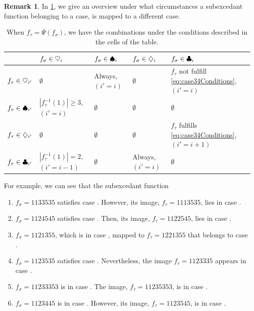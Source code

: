 \documentclass[reqno]{amsart}
\theoremstyle{definition}
\newtheorem{remark}[theorem]{Remark}
\newcommand{\fretherD}{\Psi}
\begin{document}
\begin{remark}
In \cref{tab:casesCombinations}, we give an overview under what circumstances 
a subexcedant function belonging to a case, is mapped to a different case.
%
\begin{table}[!ht]
\begin{center}
\begin{tabular}{ l p{2cm} p{1.7cm} p{1.7cm} p{2.5cm} }
\; & $f_\sigma\in\caseOne[i]$ & $f_\sigma\in\caseTwo[i]$ & $f_\sigma\in\caseThree[i]$ & $f_\sigma\in\caseFour[i]$ \\
\toprule
\rowcolor{gray!10}
$f_\tau\in\caseOne[i']$   & $\emptyset$  & Always, $(i'=i)$ & $\emptyset$ & $f_\tau$ not fulfill \eqref{eq:case34Conditions}, $(i'=i)$ \\
$f_\tau\in\caseTwo[i']$   & $|f_\tau^{-1}(1)|\geq 3$, $(i'=i)$  & $\emptyset$ & $\emptyset$ & $\emptyset$\\
\rowcolor{gray!10}
$f_\tau\in\caseThree[i']$ & $\emptyset$  & $\emptyset$ & $\emptyset$ & $f_\tau$ fulfills \eqref{eq:case34Conditions},  $(i'=i+1)$ \\
$f_\tau\in\caseFour[i']$  & $|f_\tau^{-1}(1)| =2$, $(i'=i-1)$  & $\emptyset$ & Always, $(i'=i)$ & $\emptyset$\\
\bottomrule
\end{tabular}
\medskip
\caption{
When $f_\tau = \fretherD(f_\sigma)$, we have the combinations under the 
conditions described in the cells of the table.
}\label{tab:casesCombinations}
\end{center}
\end{table}
\end{remark}

For example, we can see that the subexcedant function
\begin{enumerate}
	\item $f_\sigma=1133535$ satisfies case \caseOne[2]. However, its image, $f_\tau=1113535$, lies in case \caseTwo[2].
	\item $f_\sigma=1124545$ satisfies case \caseOne[3]. Then, its image, $f_\tau=1122545$, lies in case \caseFour[2].
	\item $f_\sigma=1121355$, which is in case \caseTwo[2], mapped to $f_\tau=1221355$ that belongs to case \caseOne[2]. 
	\item $f_\sigma=1123535$ satisfies case \caseThree[3]. Nevertheless, the image $f_\tau=1123335$ appears in case \caseFour[3].
	\item  $f_\sigma=11233353$ is in case \caseFour[3]. The image, $f_\tau=11235353$, is in case \caseThree[3].
	\item $f_\sigma=1123445$ is in case \caseFour[4]. However, its image, $f_\tau=1123545$, is in case \caseOne[5].
\end{enumerate}
\end{document}
